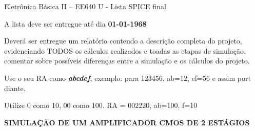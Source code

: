 \documentclass[addpoints]{exam}
\begin{document}
 
\begin{center}
Eletrônica Básica II – EE640 U - Lista SPICE final
\end{center}
 
\vspace{5mm}
 
\noindent{}
\hfill
{}

\vspace{5mm}

\noindent{}
\hfill
{}

\begin{center}
A lista deve ser entregue até dia \textbf{01-01-1968}
\end{center}

\vspace{2mm}

\begin{center}
\gradetable[h][questions]
\end{center}

\vspace{2mm}

\begin{framed} 

Deverá  ser entregue um relatório contendo a descrição completa do projeto, evidenciando TODOS os cálculos realizados e toadas as etapas de simulação. comentar sobre possíveis diferenças entre a simulação e os cálculos do projeto.

\end{framed}

\begin{center}

\vspace{2mm}

Use o seu RA como \textit{\textbf{abcdef}}, exemplo: para 123456, ab=12, ef=56 e assim port diante.

\vspace{2mm}

Utilize 0 como 10, 00 como 100. RA = 002220, ab=100, f=10
\end{center}

\vspace{2mm}

\begin{center}
\textbf{SIMULAÇÃO DE UM AMPLIFICADOR CMOS DE 2 ESTÁGIOS}
\end{center}
\end{document}
